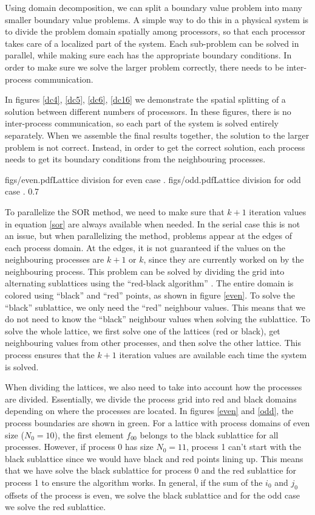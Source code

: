 \documentclass[10pt]{article}
\begin{document}
Using domain decomposition, we can split a boundary value problem into many smaller boundary value problems. A simple way to do this in a physical system is to divide the problem domain spatially among processors, so that each processor takes care of a localized part of the system. Each sub-problem can be solved in parallel, while making sure each has the appropriate boundary conditions. In order to make sure we solve the larger problem correctly, there needs to be inter-process communication.

In figures \ref{dc4}, \ref{dc5}, \ref{dc6}, \ref{dc16} we demonstrate the spatial splitting of a solution between different numbers of processors. In these figures, there is no inter-process communication, so each part of the system is solved entirely separately. When we assemble the final results together, the solution to the larger problem is not correct. Instead, in order to get the correct solution, each process needs to get its boundary conditions from the neighbouring processes.

\dualfigs
{figs/even.pdf}{Lattice division for even case \cite{rba}.\label{even}}
{figs/odd.pdf}{Lattice division for odd case \cite{rba}.\label{odd}}
{0.7}

To parallelize the SOR method, we need to make sure that $k+1$ iteration values in equation \ref{sor} are always available when needed. In the serial case this is not an issue, but when parallelizing the method, problems appear at the edges of each process domain. At the edges, it is not guaranteed if the values on the neighbouring processes are $k+1$ or $k$, since they are currently worked on by the neighbouring process. This problem can be solved by dividing the grid into alternating sublattices using the ``red-black algorithm'' \cite{rb}. The entire domain is colored using ``black'' and ``red'' points, as shown in figure \ref{even}. To solve the ``black'' sublattice, we only need the ``red'' neighbour values. This means that we do not need to know the ``black'' neighbour values when solving the sublattice. To solve the whole lattice, we first solve one of the lattices (red or black), get neighbouring values from other processes, and then solve the other lattice. This process ensures that the $k+1$ iteration values are available each time the system is solved.

When dividing the lattices, we also need to take into account how the processes are divided. Essentially, we divide the process grid into red and black domains depending on where the processes are located. In figures \ref{even} and \ref{odd}, the process boundaries are shown in green. For a lattice with process domains of even size ($N_0=10$), the first element $f_{00}$ belongs to the black sublattice for all processes. However, if process 0 has size $N_0=11$, process 1 can't start with the black sublattice since we would have black and red points lining up. This means that we have solve the black sublattice for process 0 and the red sublattice for process 1 to ensure the algorithm works. In general, if the sum of the $i_0$ and $j_0$ offsets of the process is even, we solve the black sublattice and for the odd case we solve the red sublattice.
\end{document}
